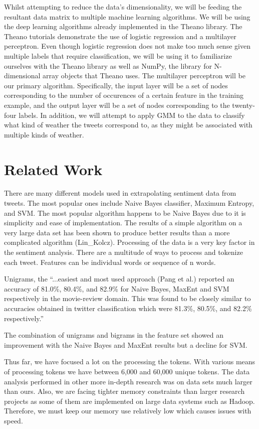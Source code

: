 \documentclass{article}
\begin{document}
Whilst attempting to reduce the data's dimensionality, we will be feeding the resultant data matrix to multiple machine learning algorithms. We will be using the deep learning algorithms already implemented in the Theano library. The Theano tutorials demonstrate the use of logistic regression and a multilayer perceptron. Even though logistic regression does not make too much sense given multiple labels that require classification, we will be using it to familiarize ourselves with the Theano library as well as NumPy, the library for N-dimensional array objects that Theano uses. The multilayer perceptron will be our primary algorithm. Specifically, the input layer will be a set of nodes corresponding to the number of occurences of a certain feature in the training example, and the output layer will be a set of nodes corresponding to the twenty-four labels. In addition, we will attempt to apply GMM to the data to classify what kind of weather the tweets correspond to, as they might be associated with multiple kinds of weather.

\section{Related Work}
There are many different models used in extrapolating sentiment data from tweets. The most popular ones include Naive Bayes classifier, Maximum Entropy, and SVM. The most popular algorithm happens to be Naive Bayes due to it is simplicity and ease of implementation. The results of a simple algorithm on a very large data set has been shown to produce better results than a more complicated algorithm (Lin\_Kolcz). Processing of the data is a very key factor in the sentiment analysis. There are a multitude of ways to process and tokenize each tweet. Features can be individual words or sequence of n words.

Unigrams, the ``...easiest and most used approach (Pang et al.) reported an accuracy of 81.0\%, 80.4\%, and 82.9\% for Naive Bayes, MaxEnt and SVM respectively in the movie-review domain. This was found to be closely similar to accuracies obtained in twitter classification which were 81.3\%, 80.5\%, and 82.2\% respectively.''

The combination of unigrams and bigrams in the feature set showed an improvement with the Naive Bayes and MaxEnt results but a decline for SVM.

Thus far, we have focused a lot on the processing the tokens. With various means of processing tokens we have between 6,000 and 60,000 unique tokens. The data analysis performed in other more in-depth research was on data sets much larger than ours. Also, we are facing tighter memory constraints than larger research projects as some of them are implemented on large data systems such as Hadoop. Therefore, we must keep our memory use relatively low which causes issues with speed.
\end{document}
